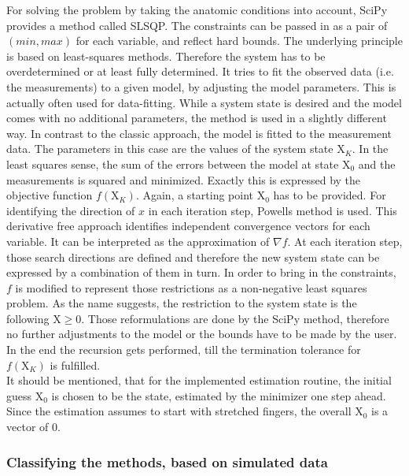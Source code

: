 For solving the problem by taking the anatomic conditions into account, SciPy provides a method called \ac{SLSQP}. The constraints can be passed in as a pair of $ (min,max) $ for each variable, and reflect hard bounds. The underlying principle is based on least-squares methods. Therefore the system has to be overdetermined or at least fully determined. It tries to fit the observed data (i.e. the measurements) to a given model, by adjusting the model parameters. This is actually often used for data-fitting. While a system state is desired and the model comes with no additional parameters, the method is used in a slightly different way. In contrast to the classic approach, the model is fitted to the measurement data. The parameters in this case are the values of the system state $ \mathrm{X}_K $. In the least squares sense, the sum of the errors between the model at state $ \mathrm{X}_{0} $ and the measurements is squared and minimized. Exactly this is expressed by the objective function $ f(\mathrm{X}_K) $. Again, a starting point $ \mathrm{X}_{0} $ has to be provided. For identifying the direction of $ x $ in each iteration step, Powells method \cite{powell1964efficient} is used. This derivative free approach identifies independent convergence vectors for each variable. It can be interpreted as the approximation of $ \nabla f $. At each iteration step, those search directions are defined and therefore the new system state can be expressed by a combination of them in turn. In order to bring in the constraints, $ f $ is modified to represent those restrictions as a non-negative least squares problem. As the name suggests, the restriction to the system state is the following $ \mathrm{X} \geq 0$. Those reformulations are done by the SciPy method, therefore no further adjustments to the model or the bounds have to be made by the user. In the end the recursion gets performed, till the termination tolerance for $ f(\mathrm{X}_K) $ is fulfilled.\\
It should be mentioned, that for the implemented estimation routine, the initial guess $ \mathrm{X}_{0} $ is chosen to be the state, estimated by the minimizer one step ahead. Since the estimation assumes to start with stretched fingers, the overall $ \mathrm{X}_{0} $ is a vector of 0.  


\subsubsection{Classifying the methods, based on simulated data}

